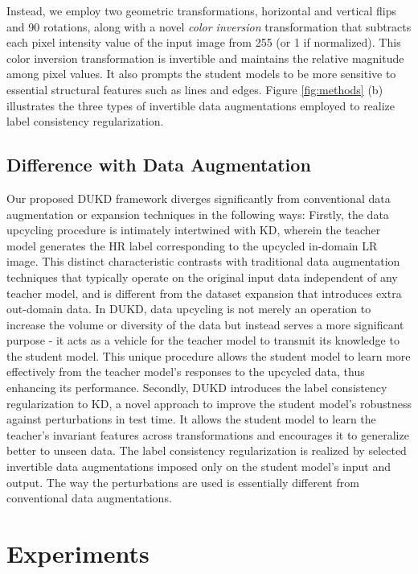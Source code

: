 \documentclass[10pt,twocolumn,letterpaper]{article}
\begin{document}
Instead, we employ two geometric transformations, horizontal and vertical flips and 90{\textdegree} rotations, along with a novel \textit{color inversion} transformation 
that subtracts each pixel intensity value of the input image from 255 (or 1 if normalized).
This color inversion transformation is invertible and maintains the relative magnitude among pixel values. It also prompts the student models to be more sensitive to essential structural features such as lines and edges.
Figure \ref{fig:methods} (b) illustrates the three types of invertible data augmentations employed to realize label consistency regularization.

\subsection{Difference with Data Augmentation}
Our proposed DUKD framework diverges significantly from conventional data augmentation or expansion techniques in the following ways:
Firstly, the data upcycling procedure is intimately intertwined with KD, wherein the teacher model generates the HR label corresponding to the upcycled in-domain LR image. This distinct characteristic contrasts with traditional data augmentation techniques that typically operate on the original input data independent of any teacher model, and is different from the dataset expansion that introduces extra out-domain data. In DUKD, data upcycling is not merely an operation to increase the volume or diversity of the data but instead serves a more significant purpose - it acts as a vehicle for the teacher model to transmit its knowledge to the student model. This unique procedure allows the student model to learn more effectively from the teacher model's responses to the upcycled data, thus enhancing its performance.
Secondly, DUKD introduces the label consistency regularization to KD, a novel approach to improve the student model's robustness against perturbations in test time. 
It allows the student model to learn the teacher's invariant features across transformations and encourages it to generalize better to unseen data. The label consistency regularization is realized by selected invertible data augmentations imposed only on the student model's input and output. The way the perturbations are used is essentially different from conventional data augmentations.

 \section{Experiments}\label{sec: experiments}
\end{document}
